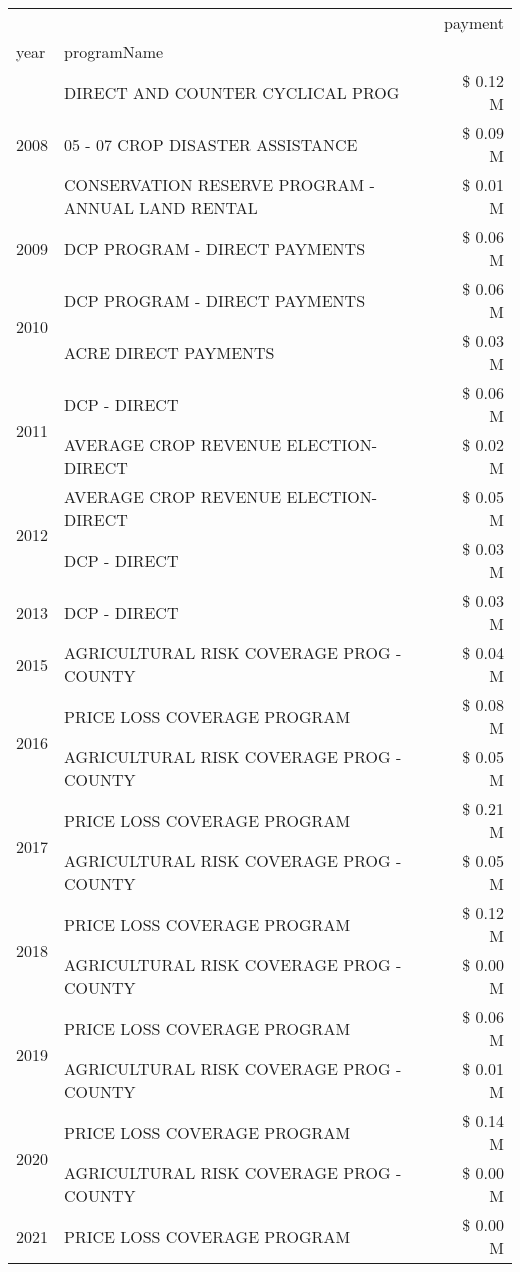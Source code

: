 \begin{tabular}{llr}
\toprule
 &  & payment \\
year & programName &  \\
\midrule
\multirow[t]{3}{*}{2008} & DIRECT AND COUNTER CYCLICAL PROG & \$ 0.12 M \\
 & 05 - 07 CROP DISASTER ASSISTANCE & \$ 0.09 M \\
 & CONSERVATION RESERVE PROGRAM - ANNUAL LAND RENTAL & \$ 0.01 M \\
\cline{1-3}
2009 & DCP PROGRAM - DIRECT PAYMENTS & \$ 0.06 M \\
\cline{1-3}
\multirow[t]{2}{*}{2010} & DCP PROGRAM - DIRECT PAYMENTS & \$ 0.06 M \\
 & ACRE DIRECT PAYMENTS & \$ 0.03 M \\
\cline{1-3}
\multirow[t]{2}{*}{2011} & DCP - DIRECT & \$ 0.06 M \\
 & AVERAGE CROP REVENUE ELECTION-DIRECT & \$ 0.02 M \\
\cline{1-3}
\multirow[t]{2}{*}{2012} & AVERAGE CROP REVENUE ELECTION-DIRECT & \$ 0.05 M \\
 & DCP - DIRECT & \$ 0.03 M \\
\cline{1-3}
2013 & DCP - DIRECT & \$ 0.03 M \\
\cline{1-3}
2015 & AGRICULTURAL RISK COVERAGE PROG - COUNTY & \$ 0.04 M \\
\cline{1-3}
\multirow[t]{2}{*}{2016} & PRICE LOSS COVERAGE PROGRAM                   & \$ 0.08 M \\
 & AGRICULTURAL RISK COVERAGE PROG - COUNTY      & \$ 0.05 M \\
\cline{1-3}
\multirow[t]{2}{*}{2017} & PRICE LOSS COVERAGE PROGRAM & \$ 0.21 M \\
 & AGRICULTURAL RISK COVERAGE PROG - COUNTY & \$ 0.05 M \\
\cline{1-3}
\multirow[t]{2}{*}{2018} & PRICE LOSS COVERAGE PROGRAM & \$ 0.12 M \\
 & AGRICULTURAL RISK COVERAGE PROG - COUNTY & \$ 0.00 M \\
\cline{1-3}
\multirow[t]{2}{*}{2019} & PRICE LOSS COVERAGE PROGRAM & \$ 0.06 M \\
 & AGRICULTURAL RISK COVERAGE PROG - COUNTY & \$ 0.01 M \\
\cline{1-3}
\multirow[t]{2}{*}{2020} & PRICE LOSS COVERAGE PROGRAM & \$ 0.14 M \\
 & AGRICULTURAL RISK COVERAGE PROG - COUNTY & \$ 0.00 M \\
\cline{1-3}
2021 & PRICE LOSS COVERAGE PROGRAM & \$ 0.00 M \\
\cline{1-3}
\bottomrule
\end{tabular}
